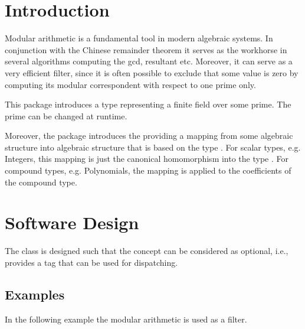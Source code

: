 \cleardoublepage
{}
\label{chap:modular_arithmetic}



\section{Introduction}

Modular arithmetic is a fundamental tool in modern algebraic systems. In conjunction with the Chinese remainder theorem it serves as the workhorse in several algorithms computing the gcd, resultant etc. Moreover, it can serve as a very efficient filter, since it is often possible to exclude that some value is zero by computing its modular correspondent with respect to one prime only. 

This package introduces a type 
representing a finite field over some prime. 
The prime can be changed at runtime. 

Moreover, the package introduces the  
providing a mapping from some algebraic structure  into algebraic 
structure that is based on the type .  
For scalar types, e.g. Integers, this mapping is just the canonical homomorphism
into the type . 
For compound types, e.g. Polynomials, the mapping is applied to the 
coefficients of the compound type. 


\section{Software Design}

The class  is designed such that the concept 
 can be considered as optional, i.e., 
 provides a tag that can be used for dispatching. 

\subsection{Examples}

In the following example the modular arithmetic is used as a filter. 

